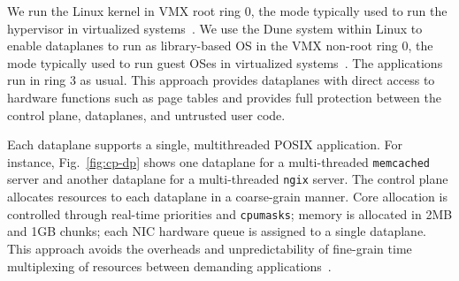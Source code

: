 We run the Linux kernel in VMX root ring 0, the mode typically used to
run the hypervisor in virtualized
systems~\cite{DBLP:journals/computer/UhligNRSMABKLS05}. We use the
Dune system within Linux to enable dataplanes to run as library-based
OS in the VMX non-root ring 0, the mode typically used to run guest
OSes in virtualized systems~\cite{belay2012dune}. The applications run
in ring 3 as usual. This approach provides dataplanes with direct
access to hardware functions such as page tables and provides full
protection between the control plane, dataplanes, and untrusted user
code. 




Each \ix dataplane supports a single, multithreaded POSIX
application. For instance, Fig.~\ref{fig:cp-dp} shows one dataplane
for a multi-threaded \texttt{memcached} server and another dataplane
for a multi-threaded \texttt{ngix} server. The control plane allocates
resources to each dataplane in a coarse-grain manner. Core allocation
is controlled through real-time priorities and \texttt{cpumasks};
memory is allocated in 2MB and 1GB chunks; each NIC hardware queue is
assigned to a single dataplane. This approach avoids the overheads and
unpredictability of fine-grain time multiplexing of resources between
demanding applications~\cite{Leverich:RHSU:2014}.

